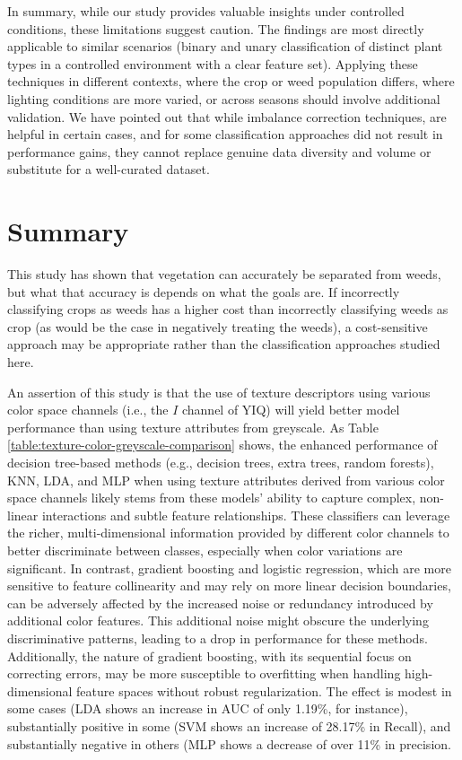 \documentclass[letterpaper, notitlepage]{report}
\begin{document}
In summary, while our study provides valuable insights under controlled conditions, these limitations suggest caution. The findings are most directly applicable to similar scenarios (binary and unary classification of distinct plant types in a controlled environment with a clear feature set). Applying these techniques in different contexts, where the crop or weed population differs, where lighting conditions are more varied, or across seasons should involve additional validation. We have pointed out that while  imbalance correction techniques, are helpful in certain cases, and for some classification approaches did not result in performance gains, they cannot replace genuine data diversity and volume or substitute for a well-curated dataset.

\section{Summary}
This study has shown that vegetation can accurately be separated from weeds, but what that accuracy is depends on what the goals are. If incorrectly classifying crops as weeds has a higher cost than incorrectly classifying weeds as crop (as would be the case in negatively treating the weeds), a cost-sensitive approach may be appropriate rather than the classification approaches studied here. 

An assertion of this study is that the use of texture descriptors using various color space channels (i.e., the $I$ channel of YIQ) will yield better model performance than using texture attributes from greyscale.  As Table \ref{table:texture-color-greyscale-comparison} shows, the enhanced performance of decision tree-based methods (e.g., decision trees, extra trees, random forests), \gls{KNN}, \gls{LDA}, and \gls{MLP} when using texture attributes derived from various color space channels likely stems from these models’ ability to capture complex, non-linear interactions and subtle feature relationships. These classifiers can leverage the richer, multi-dimensional information provided by different color channels to better discriminate between classes, especially when color variations are significant. In contrast, gradient boosting and logistic regression, which are more sensitive to feature collinearity and may rely on more linear decision boundaries, can be adversely affected by the increased noise or redundancy introduced by additional color features. This additional noise might obscure the underlying discriminative patterns, leading to a drop in performance for these methods. Additionally, the nature of gradient boosting, with its sequential focus on correcting errors, may be more susceptible to overfitting when handling high-dimensional feature spaces without robust regularization. The effect is modest in some cases (\gls{LDA} shows an increase in AUC of only 1.19\%, for instance), substantially positive in some (SVM shows an increase of 28.17\% in Recall), and  substantially negative in others (\gls{MLP} shows a decrease of over 11\% in precision.
\end{document}
